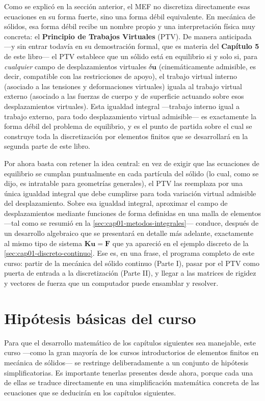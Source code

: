 Como se explicó en la sección anterior, el MEF no discretiza directamente esas ecuaciones en su forma fuerte, sino una forma débil equivalente. En mecánica de sólidos, esa forma débil recibe un nombre propio y una interpretación física muy concreta: el \textbf{Principio de Trabajos Virtuales} (PTV). De manera anticipada —y sin entrar todavía en su demostración formal, que es materia del \textbf{Capítulo 5} de este libro— el PTV establece que un sólido está en equilibrio si y solo si, para \emph{cualquier} campo de desplazamientos virtuales $\delta\bm{u}$ (cinemáticamente admisible, es decir, compatible con las restricciones de apoyo), el trabajo virtual interno (asociado a las tensiones y deformaciones virtuales) iguala al trabajo virtual externo (asociado a las fuerzas de cuerpo y de superficie actuando sobre esos desplazamientos virtuales). Esta igualdad integral —trabajo interno igual a trabajo externo, para todo desplazamiento virtual admisible— es exactamente la forma débil del problema de equilibrio, y es el punto de partida sobre el cual se construye toda la discretización por elementos finitos que se desarrollará en la segunda parte de este libro.

Por ahora basta con retener la idea central: en vez de exigir que las ecuaciones de equilibrio se cumplan puntualmente en cada partícula del sólido (lo cual, como se dijo, es intratable para geometrías generales), el PTV las reemplaza por una única igualdad integral que debe cumplirse para toda variación virtual admisible del desplazamiento. Sobre esa igualdad integral, aproximar el campo de desplazamientos mediante funciones de forma definidas en una malla de elementos —tal como se resumió en la \cref{sec:cap01-metodos-integrales}— conduce, después de un desarrollo algebraico que se presentará en detalle más adelante, exactamente al mismo tipo de sistema $\mathbf{K}\mathbf{u}=\mathbf{F}$ que ya apareció en el ejemplo discreto de la \cref{sec:cap01-discreto-continuo}. Ese es, en una frase, el programa completo de este curso: partir de la mecánica del sólido continuo (Parte I), pasar por el PTV como puerta de entrada a la discretización (Parte II), y llegar a las matrices de rigidez y vectores de fuerza que un computador puede ensamblar y resolver.

\section{Hipótesis básicas del curso}
\label{sec:cap01-hipotesis}

Para que el desarrollo matemático de los capítulos siguientes sea manejable, este curso —como la gran mayoría de los cursos introductorios de elementos finitos en mecánica de sólidos— se restringe deliberadamente a un conjunto de hipótesis simplificatorias. Es importante tenerlas presentes desde ahora, porque cada una de ellas se traduce directamente en una simplificación matemática concreta de las ecuaciones que se deducirán en los capítulos siguientes.

